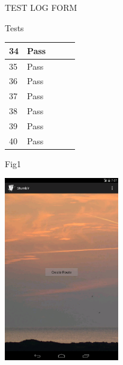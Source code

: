 \documentclass{article}
\begin{document}
\begin{section}{TEST LOG FORM}
\begin{subsection}{Tests}
\begin{tabularx}{\linewidth}{| p{1.5cm} | p{2cm} | p{7.5cm} | p{2cm} | X |}
34
&
Pass
&

&

&

\\
\hline

35
&
Pass
&

&

&

\\
\hline

36
&
Pass
&

&

&

\\
\hline

37
&
Pass
&

&

&

\\
\hline

38
&
Pass
&

&

&

\\
\hline

39
&
Pass
&

&

&

\\
\hline

40
&
Pass
&

&

&

\\
\hline

			\end{tabularx}
		\end{subsection}
	\end{section}
	
	\newpage
	
	\graphicspath{ {../} }
	Fig1
	
	\includegraphics[width=5cm]{1}
\end{document}

